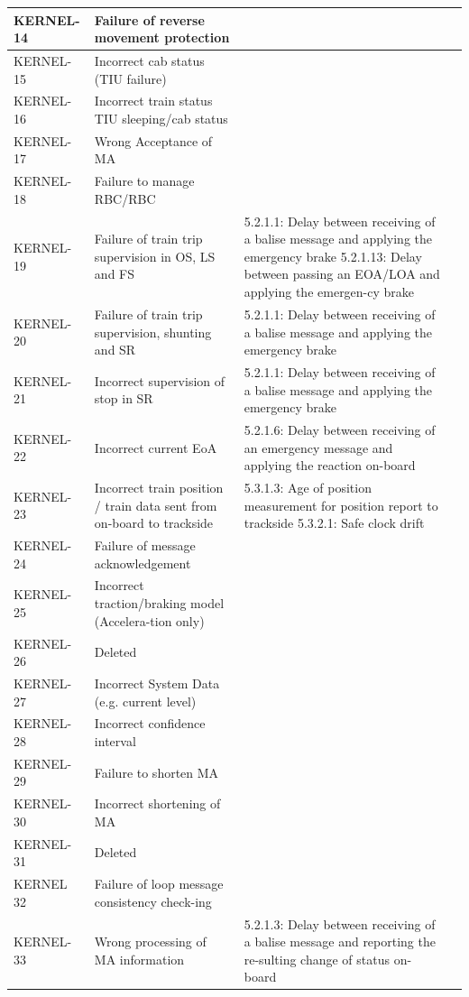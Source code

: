 \documentclass{template/openetcs_report}
\begin{document}
\begin{center}
\begin{supertabular}[t]{|p{2cm}|p{4cm}|p{4cm}|p{4cm}|}
\hline KERNEL-14 & Failure of reverse movement protection &  &  \\ 
\hline KERNEL-15 & Incorrect cab status (TIU failure) &  &  \\ 
\hline KERNEL-16 & Incorrect train status TIU sleeping/cab status &  &  \\ 
\hline KERNEL-17 & Wrong Acceptance of MA &  &  \\ 
\hline KERNEL-18 & Failure to manage RBC/RBC &  &  \\ 
\hline KERNEL-19 & Failure of train trip supervision in OS, LS and FS & 
5.2.1.1: Delay between receiving of a balise message and applying the emergency brake
5.2.1.13: Delay between passing an EOA/LOA and applying the emergen-cy brake  &  \\
\hline KERNEL-20 & Failure of train trip supervision, shunting and SR & 
5.2.1.1: Delay between receiving of a balise message and applying the emergency brake &  \\ 
\hline KERNEL-21 & Incorrect supervision of stop in SR & 
5.2.1.1: Delay between receiving of a balise message and applying the emergency brake &  \\ 
\hline KERNEL-22 & Incorrect current EoA & 
5.2.1.6: Delay between receiving of an emergency message and applying the reaction on-board &  \\ 
\hline KERNEL-23 & Incorrect train position / train data sent from on-board to trackside & 
5.3.1.3: Age of position measurement for position report to trackside
5.3.2.1: Safe clock drift &  \\ 
\hline KERNEL-24 & Failure of message acknowledgement &  &  \\ 
\hline KERNEL-25 & Incorrect traction/braking model (Accelera-tion only) &  &  \\ 
\hline KERNEL-26 & Deleted &  &  \\ 
\hline KERNEL-27 & Incorrect System Data (e.g. current level) &  &  \\ 
\hline KERNEL-28 & Incorrect confidence interval &  &  \\ 
\hline KERNEL-29 & Failure to shorten MA &  &  \\ 
\hline KERNEL-30 & Incorrect shortening of MA &  &  \\ 
\hline KERNEL-31 & Deleted &  &  \\ 
\hline KERNEL 32 & Failure of loop message consistency check-ing &  &  \\ 
\hline KERNEL-33 & Wrong processing of MA information  & 5.2.1.3: Delay between receiving of a balise message and reporting the re-sulting change of status on-board

\end{supertabular}
\end{center}
\end{document}
